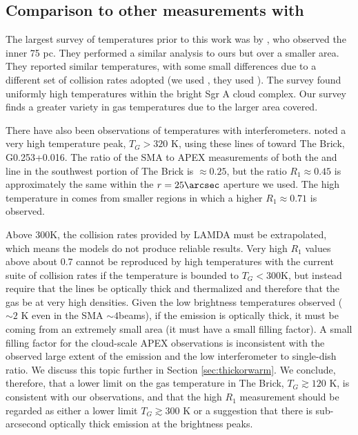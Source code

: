 \subsection{Comparison to other measurements with \para}
\label{sec:h2cocompare}
The largest survey of \para temperatures prior to this work was by
\citet{Ao2013a}, who observed the inner 75 pc.  They performed a similar
analysis to ours but over a smaller area.  They reported similar temperatures,
with some small differences due to a different set of collision rates adopted
(we used \citet{Wiesenfeld2013a}, they used \citet{Green1991a}).  The \citet{Ao2013a}
survey found uniformly high temperatures within the bright Sgr A cloud complex.
Our survey finds a greater variety in gas temperatures due to the larger area
covered.

There have also been observations of \para temperatures with interferometers.
\citet{Johnston2014a} noted a very high temperature peak, $T_G>320$ K, using these
lines of \para toward The Brick, G0.253+0.016.  The ratio of the
SMA to APEX measurements of both the \threeohthree and \threetwoone line in the
southwest portion of The Brick is $\approx0.25$, but the ratio $R_1\approx0.45$
is approximately the same within the $r=25\arcsec$ aperture we used.  The high
temperature in \citet{Johnston2014a} comes from smaller regions in which a
higher $R_1\approx0.71$ is observed.

Above 300K, the collision rates provided by LAMDA
\citep{Green1991a,Schoier2005a,Wiesenfeld2013a} must be extrapolated, which
means the models do not produce reliable results.  Very high $R_1$ values above
about 0.7 cannot be reproduced by high temperatures with the current suite of
collision rates if the temperature is bounded to $T_G<300$K, but instead require
that the lines be optically thick and thermalized and therefore that the gas be
at very high densities.   Given the low brightness temperatures observed
($\sim2$ K even in the SMA $\sim4$\arcsec beams), if the emission is optically
thick, it must be coming from an extremely small area (it must have a small
filling factor).  A small filling factor for the cloud-scale APEX observations
is inconsistent with the observed large extent of the emission and the low
interferometer to single-dish ratio.  We discuss this topic further in Section
\ref{sec:thickorwarm}.  We conclude, therefore, that a lower limit on the gas
temperature in The Brick, $T_G\gtrsim120$ K, is consistent with our
observations, and that the \citet{Johnston2014a} high $R_1$ measurement should
be regarded as either a lower limit $T_G\gtrsim300$ K or a suggestion that
there is sub-arcsecond optically thick \para \threeohthree emission at the
brightness peaks.



